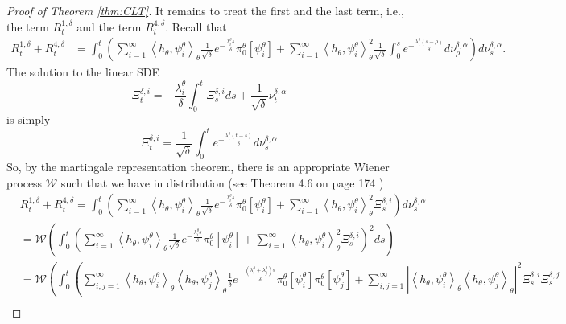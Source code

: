 \documentclass{article}
\begin{document}
\begin{proof} [Proof of Theorem \ref{thm:CLT}]
It remains to treat the first and the last term, i.e., the term $R^{1,\delta}_{t}$ and the term $R^{4,\delta}_{t}$. Recall that
\begin{align}
R^{1,\delta}_{t}+R^{4,\delta}_{t}&=\int_{0}^{t}\left( \sum_{i=1}^{\infty}\left<h_{\theta},\psi_i^{\theta}\right>_{\theta} \frac{1}{\sqrt\delta}e^{-\frac{\lambda_i^{\theta} s}{\delta}}\pi_0^{\theta}[\psi_i^{\theta}]+\sum_{i=1}^{\infty}\left<h_{\theta},\psi_i^{\theta}\right>_{\theta}^{2}\frac{1}{\sqrt\delta} \int_0^s e^{-\frac{\lambda_i^{\theta}(s-\rho)}{\delta}}d\nu_\rho^{\delta,\alpha}\right)d\nu_s^{\delta,\alpha}.
\end{align}
The solution to the linear SDE
\begin{equation}
\Xi^{\delta,i}_{t}=-\frac{\lambda_{i}^{\theta}}{\delta}\int_{0}^{t}\Xi^{\delta,i}_{s}ds+\frac{1}{\sqrt{\delta}}\nu_t^{\delta,\alpha}\label{Eq:OUSDE1}
\end{equation}
is simply
\begin{equation}
\Xi^{\delta,i}_{t}=\frac{1}{\sqrt\delta}\int_0^t e^{-\frac{\lambda_i^{\theta}(t-s)}{\delta}}d\nu_s^{\delta,\alpha}\label{Eq:OUSDE2}
\end{equation}
So, by the martingale representation theorem, there is an appropriate Wiener process $\mathcal{W}$ such that we have in distribution (see Theorem 4.6 on page 174 \cite{KaratzasShreve})
\begin{align}
&R^{1,\delta}_{t}+R^{4,\delta}_{t}=\int_{0}^{t}\left( \sum_{i=1}^{\infty}\left<h_{\theta},\psi_i^{\theta}\right>_{\theta} \frac{1}{\sqrt\delta}e^{-\frac{\lambda_i^{\theta} s}{\delta}}\pi_0^{\theta}[\psi_i^{\theta}]+\sum_{i=1}^{\infty}\left<h_{\theta},\psi_i^{\theta}\right>_{\theta}^{2}\Xi^{\delta,i}_{s}\right)d\nu_s^{\delta,\alpha}\nonumber\\
&=\mathcal{W}\left(\int_{0}^{t}\left( \sum_{i=1}^{\infty}\left<h_{\theta},\psi_i^{\theta}\right>_{\theta} \frac{1}{\sqrt\delta}e^{-\frac{\lambda_i^{\theta} s}{\delta}}\pi_0^{\theta}[\psi_i^{\theta}]+\sum_{i=1}^{\infty}\left<h_{\theta},\psi_i^{\theta}\right>_{\theta}^{2}\Xi^{\delta,i}_{s}\right)^{2}ds\right)\nonumber\\
&=\mathcal{W}\left(\int_{0}^{t}\left( \sum_{i,j=1}^{\infty}\left<h_{\theta},\psi_i^{\theta}\right>_{\theta}\left<h_{\theta},\psi_j^{\theta}\right>_{\theta} \frac{1}{\delta}e^{-\frac{\left(\lambda_i^{\theta} +\lambda_j^{\theta}\right) s}{\delta}}\pi_0^{\theta}[\psi_i^{\theta}]\pi_0^{\theta}[\psi_j^{\theta}]+
\sum_{i,j=1}^{\infty}\left|\left<h_{\theta},\psi_i^{\theta}\right>_{\theta}\left<h_{\theta},\psi_j^{\theta}\right>_{\theta}\right|^{2}\Xi^{\delta,i}_{s}\Xi^{\delta,j}_{s}\right.\right.\nonumber\\

\end{align}
\end{proof}
\end{document}
